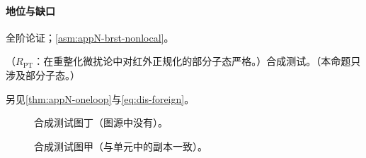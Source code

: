 \paragraph{地位与缺口}全阶论证；\cref{asm:appN-brst-nonlocal}。

\begin{proposition}\label{prop:dy-misplaced}
（$R_{\mathrm{PT}}$：在重整化微扰论中对红外正规化的部分子态严格。）合成测试。（本命题只涉及部分子态。）
\end{proposition}

另见\cref{thm:appN-oneloop}与\cref{eq:dis-foreign}。

\begin{figure}[htbp]
\centering
{}
\caption{合成测试图丁（图源中没有）。}\label{fig:synth-nosource}
\end{figure}

\begin{figure}[htbp]
\centering
{}
\caption{合成测试图甲（与单元中的副本一致）。}\label{fig:synth-same}
\end{figure}
